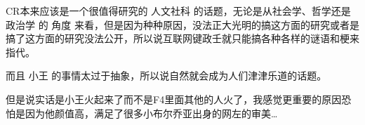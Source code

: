 \begin{zhihuanswer}
CR本来应该是一个很值得研究的 人文社科 的话题，无论是从社会学、哲学还是
政治学 的 角度
来看，但是因为种种原因，没法正大光明的搞这方面的研究或者是搞了这方面的研究没法公开，所以说互联网键政壬就只能搞各种各样的谜语和梗来指代。

而且 小王 的事情太过于抽象，所以说自然就会成为人们津津乐道的话题。

但是说实话是小王火起来了而不是F4里面其他的人火了，我感觉更重要的原因恐怕是因为他颜值高，满足了很多小布尔乔亚出身的网左的审美\ldots{}
\end{zhihuanswer}
